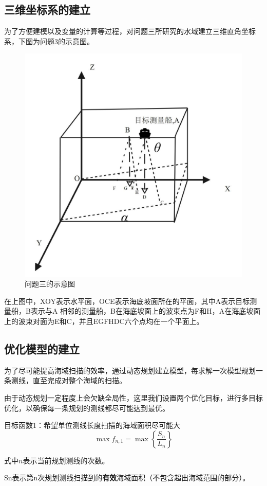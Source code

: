 \documentclass[12pt,a4paper]{article}
\begin{document}
\subsection{三维坐标系的建立}
为了方便建模以及变量的计算等过程，对问题三所研究的水域建立三维直角坐标系，下图为问题3的示意图。
\begin{figure}[H]
	\centering
	\includegraphics[width=0.8\linewidth]{media/image41}
	\caption{问题三的示意图}
	\label{fig3}
\end{figure}

在上图中，XOY表示水平面，OCE表示海底坡面所在的平面，其中A表示目标测量船，B表示与A 相邻的测量船，B在海底坡面上的波束点为F和H，A在海底坡面上的波束对面为E和C，并且EGFHDC六个点均在一个平面上。

\subsection{优化模型的建立}
为了尽可能提高海域扫描的效率，通过动态规划建立模型，每求解一次模型规划一条测线，直至完成对整个海域的扫描。

由于动态规划一定程度上会欠缺全局性，这里我们设置两个优化目标，进行多目标优化，以确保每一条规划的测线都尽可能达到最优。

目标函数1：希望单位测线长度扫描的海域面积尽可能大
$$
\max f_{n, 1}=\max \left\{\frac{S_n}{L_n}\right\}
$$

	式中$n$表示当前规划测线的次数。
	
	Sn表示第n次规划测线扫描到的\textbf{有效}海域面积（不包含超出海域范围的部分）。
	
\end{document}
